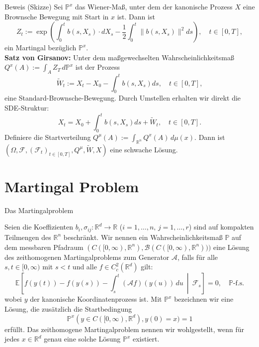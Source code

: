 \documentclass[11pt,aspectratio=169]{beamer}
\begin{document}
\begin{frame}{Beweis (Skizze)}\tiny
  Sei $\mathbb{P}^x$ das Wiener-Maß, unter dem der kanonische Prozess $X$ eine Brownsche Bewegung mit Start in $x$ ist. Dann ist
  \[
  Z_t := \exp \left( \int_0^t b(s,X_s) \cdot dX_s - \frac{1}{2} \int_0^t \| b(s,X_s) \|^2 ds \right), \quad t \in [0,T],
  \]
  ein Martingal bezüglich $\mathbb{P}^x$. \\
  \vspace{0.2cm}
  \textbf{Satz von Girsanov:} Unter dem maßgewechselten Wahrscheinlichkeitsmaß $Q^x(A) := \int_A Z_T \, d\mathbb{P}^x$ ist der Prozess
  \[
  \tilde{W}_t := X_t - X_0 - \int_0^t b(s,X_s) ds, \quad t \in [0,T],
  \]
  eine Standard-Brownsche-Bewegung. Durch Umstellen erhalten wir direkt die SDE-Struktur:
  \[
  X_t = X_0 + \int_0^t b(s,X_s) ds + \tilde{W}_t, \quad t \in [0,T].
  \]
  Definiere die Startverteilung $Q^\mu(A) := \int_{\mathbb{R}^n} Q^x(A) \, d\mu(x)$. Dann ist $(\Omega, \mathcal{F}, (\mathcal{F}_t)_{t \in [0,T]}, Q^\mu, \tilde{W}, X)$ eine schwache Lösung.
\end{frame}



\section{Martingal Problem}
\begin{frame}{Das Martingalproblem}\small

   Seien die Koeffizienten $b_i,\sigma_{ij}: \mathbb{R}^d \to \mathbb{R}$ ($i=1,\dots,n, \, j=1,\dots,r$) sind auf kompakten Teilmengen des $\mathbb{R}^n$ beschränkt. Wir nennen ein Wahrscheinlichkeitsmaß $\mathbb{P}$ auf dem messbaren Pfadraum $(C([0,\infty), \mathbb{R}^n), \mathcal{B}( C([0,\infty), \mathbb{R}^n) ))$ eine Lösung des zeithomogenen Martingalproblems zum Generator $\mathcal{A}$, falls für alle $s,t \in [0,\infty)$ mit $s<t$ und alle $f \in C_c^2(\mathbb{R}^d)$ gilt: 
    \[
    \mathbb{E}\left[ f(y(t)) - f(y(s)) - \int_s^t (\mathcal{A}f)(y(u)) \, du \ \middle| \ \mathcal{F}_s \right] = 0, \quad \mathbb{P}\text{-f.s.}
    \]
    wobei $y$ der kanonische Koordinatenprozess ist. Mit $\mathbb{P}^x$ bezeichnen wir eine Lösung, die zusätzlich die Startbedingung
    \[
    \mathbb{P}^x (y \in C([0,\infty), \mathbb{R}^d ), y(0) = x) = 1
    \]
    erfüllt. Das zeithomogene Martingalproblem nennen wir wohlgestellt, wenn für jedes $x \in \mathbb{R}^d$ genau eine solche Lösung $\mathbb{P}^x$ existiert.
\end{frame}
\end{document}
